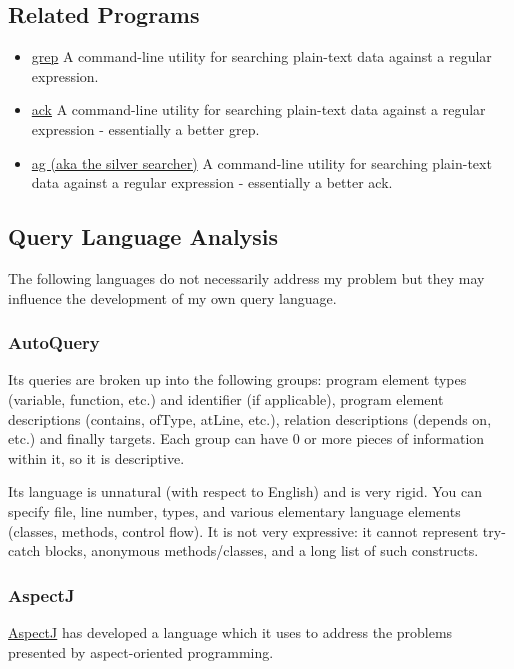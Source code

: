 \documentclass[12pt, letterpaper]{article}
\begin{document}
\subsection{Related Programs}
\begin{itemize}
    \item \href{https://en.wikipedia.org/wiki/Grep}{grep}\newline
    A command-line utility for searching plain-text data against a regular expression.
    \item \href{https://beyondgrep.com/}{ack}\newline
    A command-line utility for searching plain-text data against a regular expression - essentially a better grep.
    \item \href{https://github.com/ggreer/the_silver_searcher}{ag (aka the silver searcher)}\newline
    A command-line utility for searching plain-text data against a regular expression - essentially a better ack.
\end{itemize}

\subsection{Query Language Analysis}
The following languages do not necessarily address my problem but they may influence the development of my own query language.

\subsubsection{AutoQuery}
Its queries are broken up into the following groups: program element types (variable, function, etc.) and identifier (if applicable), program element descriptions (contains, ofType, atLine, etc.), relation descriptions (depends on, etc.) and finally targets.
Each group can have 0 or more pieces of information within it, so it is descriptive.

Its language is unnatural (with respect to English) and is very rigid.
You can specify file, line number, types, and various elementary language elements (classes, methods, control flow).
It is not very expressive: it cannot represent try-catch blocks, anonymous methods/classes, and a long list of such constructs.

\subsubsection{AspectJ}
\href{https://eclipse.org/aspectj/doc/next/progguide/starting-aspectj.html}{AspectJ} has developed a language which it uses to address the problems presented by aspect-oriented programming.  
\end{document}
